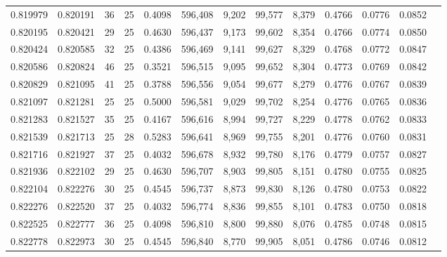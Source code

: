 \begin{tabular}{rrrrrrrrrrrrr}
0.819979 & 0.820191 &    36 &  25 &                                     0.4098 & 596,408 &   9,202 &  99,577 &   8,379 & 0.4766 & 0.0776 & 0.0852 \\
0.820195 & 0.820421 &    29 &  25 &                                     0.4630 & 596,437 &   9,173 &  99,602 &   8,354 & 0.4766 & 0.0774 & 0.0850 \\
0.820424 & 0.820585 &    32 &  25 &                                     0.4386 & 596,469 &   9,141 &  99,627 &   8,329 & 0.4768 & 0.0772 & 0.0847 \\
0.820586 & 0.820824 &    46 &  25 &                                     0.3521 & 596,515 &   9,095 &  99,652 &   8,304 & 0.4773 & 0.0769 & 0.0842 \\
0.820829 & 0.821095 &    41 &  25 &                                     0.3788 & 596,556 &   9,054 &  99,677 &   8,279 & 0.4776 & 0.0767 & 0.0839 \\
0.821097 & 0.821281 &    25 &  25 &                                     0.5000 & 596,581 &   9,029 &  99,702 &   8,254 & 0.4776 & 0.0765 & 0.0836 \\
0.821283 & 0.821527 &    35 &  25 &                                     0.4167 & 596,616 &   8,994 &  99,727 &   8,229 & 0.4778 & 0.0762 & 0.0833 \\
0.821539 & 0.821713 &    25 &  28 &                                     0.5283 & 596,641 &   8,969 &  99,755 &   8,201 & 0.4776 & 0.0760 & 0.0831 \\
0.821716 & 0.821927 &    37 &  25 &                                     0.4032 & 596,678 &   8,932 &  99,780 &   8,176 & 0.4779 & 0.0757 & 0.0827 \\
0.821936 & 0.822102 &    29 &  25 &                                     0.4630 & 596,707 &   8,903 &  99,805 &   8,151 & 0.4780 & 0.0755 & 0.0825 \\
0.822104 & 0.822276 &    30 &  25 &                                     0.4545 & 596,737 &   8,873 &  99,830 &   8,126 & 0.4780 & 0.0753 & 0.0822 \\
0.822276 & 0.822520 &    37 &  25 &                                     0.4032 & 596,774 &   8,836 &  99,855 &   8,101 & 0.4783 & 0.0750 & 0.0818 \\
0.822525 & 0.822777 &    36 &  25 &                                     0.4098 & 596,810 &   8,800 &  99,880 &   8,076 & 0.4785 & 0.0748 & 0.0815 \\
0.822778 & 0.822973 &    30 &  25 &                                     0.4545 & 596,840 &   8,770 &  99,905 &   8,051 & 0.4786 & 0.0746 & 0.0812 \\

\end{tabular}
